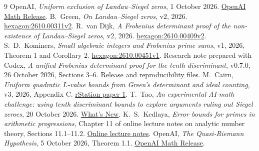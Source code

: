 \documentclass[11pt]{article}
\begin{document}
\clearpage
\begingroup\small
\begin{thebibliography}{9}
 OpenAI, \emph{Uniform exclusion of Landau--Siegel zeros},
1 October 2026.
\href{https://github.com/openai/math/tree/main/preprints/Uniform-exclusion-of-Landau-Siegel-zeros-October-1-2026}{OpenAI Math Release}.
 B.~Green, \emph{On Landau--Siegel zeros}, v2, 2026.
\href{https://hexagonmath.org/2610.00311v2}{hexagon:2610.00311v2}.
 R.~van Dijk, \emph{A Frobenius determinant proof of the
non-existence of Landau--Siegel zeros}, v2, 2026.
\href{https://hexagonmath.org/2610.00409v2}{hexagon:2610.00409v2}.
 S.~D.~Kominers, \emph{Small algebraic integers and
Frobenius prime sums}, v1, 2026, Theorem 1 and Corollary 2.
\href{https://hexagonmath.org/2610.00451v1}{hexagon:2610.00451v1}.
 Research note prepared with Codex,
\emph{A unified Frobenius determinant proof for the tenth discriminant},
v0.7.0, 26 October 2026, Sections 3--6.
\href{https://github.com/twinheterodox/tenth-discriminant/releases/tag/v0.7.0}{Release and reproducibility files}.
 M.~Cairn, \emph{Uniform quadratic $L$-value bounds from
Green's determinant and ideal counting}, v3, 2026, Appendix C.
\href{https://rstation.ai/problems/tenth_discriminant/papers/1}{rStation paper 1}.
 T.~Tao, \emph{An experimental AI-math challenge: using
tenth discriminant bounds to explore arguments ruling out Siegel zeroes},
20 October 2026.
\href{https://terrytao.wordpress.com/2026/10/20/an-experimental-ai-math-challenge-using-tenth-discriminant-bounds-to-explore-arguments-ruling-out-siegel-zeroes/}{What's New}.
 K.~S.~Kedlaya, \emph{Error bounds for primes in
arithmetic progressions}, Chapter 11 of online lecture notes on analytic
number theory, Sections 11.1--11.2.
\href{https://kskedlaya.org/ant/chapter-11.html}{Online lecture notes}.
 OpenAI, \emph{The Quasi-Riemann Hypothesis},
5 October 2026, Theorem 1.1.
\href{https://github.com/openai/math/tree/main/preprints/The-Quasi-Riemann-Hypothesis-October-5-2026}{OpenAI Math Release}.
\end{thebibliography}
\endgroup
\end{document}
